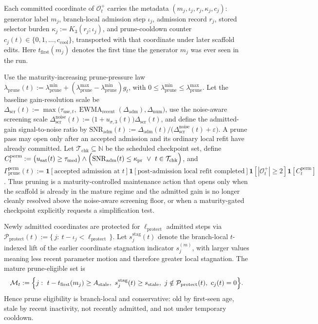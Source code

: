 \documentclass[11pt]{article}
\begin{document}
Each committed coordinate of \(\mathcal O_t^+\) carries the metadata \((m_j,\iota_j,r_j,\kappa_j,c_j)\): generator label \(m_j\), branch-local admission step \(\iota_j\), admission record \(r_j\), stored selector burden \(\kappa_j:=K_3(r_j;\iota_j)\), and prune-cooldown counter \(c_j(t)\in\{0,1,\dots,c_{\mathrm{cool}}\}\), transported with that coordinate under later scaffold edits. Here \(t_{\mathrm{first}}(m_j)\) denotes the first time the generator \(m_j\) was ever seen in the run.

Use the maturity-increasing prune-pressure law \(\lambda_{\mathrm{prune}}(t):=\lambda_{\mathrm{prune}}^{\min}+(\lambda_{\mathrm{prune}}^{\max}-\lambda_{\mathrm{prune}}^{\min})g_t\), with \(0\le \lambda_{\mathrm{prune}}^{\min}\le \lambda_{\mathrm{prune}}^{\max}\). Let the baseline gain-resolution scale be \(\Delta_{\mathrm{scr}}(t):=\max\!\bigl(\tau_{\mathrm{use},t},\operatorname{EWMA}_{\mathrm{recent}}(\Delta_{\mathrm{adm}}),\Delta_{\mathrm{num}}\bigr)\), use the noise-aware screening scale \(\Delta_{\mathrm{scr}}^{\mathrm{noise}}(t):=\bigl(1+u_{\sigma,3}(t)\bigr)\Delta_{\mathrm{scr}}(t)\), and define the admitted-gain signal-to-noise ratio by \(\mathrm{SNR}_{\mathrm{adm}}(t):=\Delta_{\mathrm{adm}}(t)\big/\bigl(\Delta_{\mathrm{scr}}^{\mathrm{noise}}(t)+\varepsilon\bigr)\). A prune pass may open only after an accepted admission and its ordinary local refit have already committed. Let \(\mathcal T_{\mathrm{chk}}\subseteq\mathbb N\) be the scheduled checkpoint set, define \(C_t^{\mathrm{perm}}:=\bigl(u_{\mathrm{sat}}(t)\ge \tau_{\mathrm{med}}\bigr)\wedge\Bigl(\mathrm{SNR}_{\mathrm{adm}}(t)\le \kappa_{\mathrm{pr}}\ \vee\ t\in\mathcal T_{\mathrm{chk}}\Bigr)\), and \(\Gamma_{\mathrm{prune}}^{\mathrm{perm}}(t):=\mathbf 1[\text{accepted admission at }t]\mathbf 1[\text{post-admission local refit completed}]\mathbf 1[|\mathcal O_t^+|\ge 2]\mathbf 1[C_t^{\mathrm{perm}}]\). Thus pruning is a maturity-controlled maintenance action that opens only when the scaffold is already in the mature regime and the admitted gain is no longer cleanly resolved above the noise-aware screening floor, or when a maturity-gated checkpoint explicitly requests a simplification test.

Newly admitted coordinates are protected for \(\ell_{\mathrm{protect}}\) admitted steps via \(\mathcal P_{\mathrm{protect}}(t):=\{\,j:\ t-\iota_j<\ell_{\mathrm{protect}}\,\}\). Let \(s_j^{\mathrm{stag}}(t)\) denote the branch-local \(t\)-indexed lift of the earlier coordinate stagnation indicator \(s_j^{(m)}\), with larger values meaning less recent parameter motion and therefore greater local stagnation. The mature prune-eligible set is
\[
\mathcal M_t
:=
\Bigl\{
j:\ 
t-t_{\mathrm{first}}(m_j)\ge A_{\mathrm{stale}},
\ 
s_j^{\mathrm{stag}}(t)\ge s_{\mathrm{stale}},
\ 
j\notin\mathcal P_{\mathrm{protect}}(t),
\ 
c_j(t)=0
\Bigr\}.
\]
Hence prune eligibility is branch-local and conservative: old by first-seen age, stale by recent inactivity, not recently admitted, and not under temporary cooldown.
\end{document}

